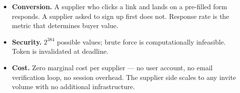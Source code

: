 \documentclass[11pt, a4paper]{article}
\begin{document}
\begin{itemize}
  \item \textbf{Conversion.} A supplier who clicks a link and lands on a
    pre-filled form responds. A supplier asked to sign up first does not.
    Response rate is the metric that determines buyer value.
  \item \textbf{Security.} $2^{384}$ possible values; brute force is
    computationally infeasible. Token is invalidated at deadline.
  \item \textbf{Cost.} Zero marginal cost per supplier --- no user account,
    no email verification loop, no session overhead. The supplier side scales
    to any invite volume with no additional infrastructure.
\end{itemize}

\end{document}
